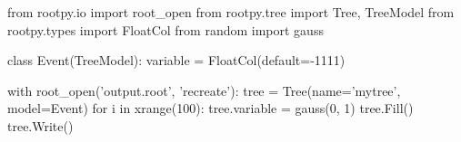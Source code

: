 \begin{footnotesize}
\begin{pyglist}[language=python,texcl=true,style=vs,bgcolor=Moccasin]
from rootpy.io import root_open
from rootpy.tree import Tree, TreeModel
from rootpy.types import FloatCol
from random import gauss

class Event(TreeModel):
    variable = FloatCol(default=-1111)

with root_open('output.root', 'recreate'):
    tree = Tree(name='mytree', model=Event)
    for i in xrange(100):
        tree.variable = gauss(0, 1)
        tree.Fill()
    tree.Write()
\end{pyglist}
\end{footnotesize}
